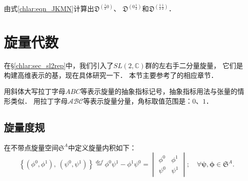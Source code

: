 \begin{exercise}
	由式\eqref{chlar:eqn_JKMN}计算出$\mathfrak{D}^{(\frac{1}{2}0)}$、
	$\mathfrak{D}^{(0\frac{1}{2})}$和$\mathfrak{D}^{(\frac{1}{2}\frac{1}{2})}$．
\end{exercise}




\section{旋量代数}
在\S\ref{chlar:sec_sl2rep}中，我们引入了$SL(2,\mathbb{C})$群的左右手二分量旋量，
它们是构建高维表示的基，现在具体研究一下．
本节主要参考了\parencite{penrose-Rindler1984}的相应章节．

用斜体大写拉丁字母$ABC$等表示旋量的抽象指标记号，抽象指标用法与张量的情形类似．
用拉丁字母$\mathcal{A}\mathcal{B}\mathcal{C}$等表示旋量分量，角标取值范围是：$0$、$1$．



\subsection{旋量度规}

在不带点旋量空间$\mathfrak{S}^A$中定义{\heiti 旋量内积}如下：
\begin{equation} \label{chlar:eqn_S-inner}
\left\{(\phi^0,\phi^1) ,\ (\psi^0,\psi^1)\right\}\overset{def}{=}   \phi^0 \psi^1 - \phi^1 \psi^0
=\begin{vmatrix} \phi^0 & \phi^1 \\ \psi^0 & \psi^1 \end{vmatrix};
\quad \forall\boldsymbol{\psi} , \boldsymbol{\phi} \in \mathfrak{S}^A.
\end{equation}

